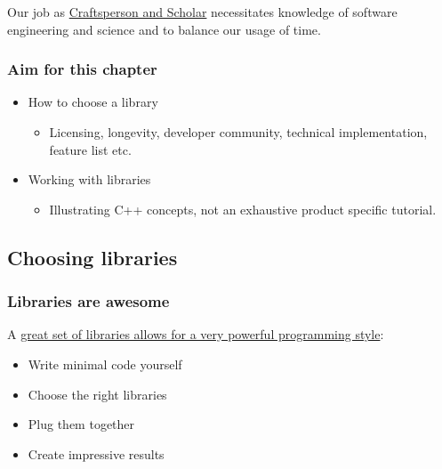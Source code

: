 Our job as
\href{http://www.software.ac.uk/blog/2012-11-09-craftsperson-and-scholar}{Craftsperson
and Scholar} necessitates knowledge of software engineering and science
and to balance our usage of time.

\subsubsection{Aim for this chapter}\label{aim-for-this-chapter}

\begin{itemize}
\itemsep1pt\parskip0pt
\item
  How to choose a library

  \begin{itemize}
  \itemsep1pt\parskip0pt
  \item
    Licensing, longevity, developer community, technical implementation,
    feature list etc.
  \end{itemize}
\item
  Working with libraries

  \begin{itemize}
  \itemsep1pt\parskip0pt
  \item
    Illustrating C++ concepts, not an exhaustive product specific
    tutorial.
  \end{itemize}
\end{itemize}

\subsection{Choosing libraries}\label{choosing-libraries}

\subsubsection{Libraries are awesome}\label{libraries-are-awesome}

A
\href{http://development.rc.ucl.ac.uk/training/engineering/session04/}{great
set of libraries allows for a very powerful programming style}:

\begin{itemize}
\itemsep1pt\parskip0pt
\item
  Write minimal code yourself
\item
  Choose the right libraries
\item
  Plug them together
\item
  Create impressive results
\end{itemize}

